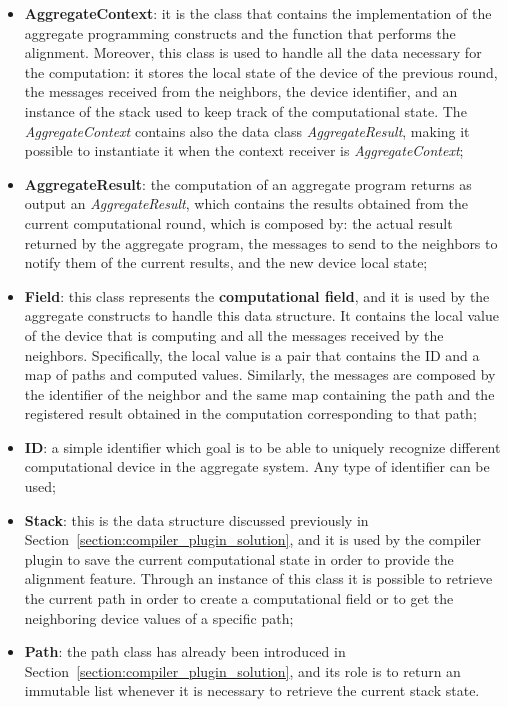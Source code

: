 \begin{itemize}
    \item \textbf{AggregateContext}: it is the class that contains the implementation of the aggregate programming constructs and the function that performs the alignment. Moreover, this class is used to handle all the data necessary for the computation: it stores the local state of the device of the previous round, the messages received from the neighbors, the device identifier, and an instance of the stack used to keep track of the computational state. The \textit{AggregateContext} contains also the data class \textit{AggregateResult}, making it possible to instantiate it when the context receiver is \textit{AggregateContext};
    \item \textbf{AggregateResult}: the computation of an aggregate program returns as output an \textit{AggregateResult}, which contains the results obtained from the current computational round, which is composed by: the actual result returned by the aggregate program, the messages to send to the neighbors to notify them of the current results, and the new device local state;
    \item \textbf{Field}: this class represents the \textbf{computational field}, and it is used by the aggregate constructs to handle this data structure. It contains the local value of the device that is computing and all the messages received by the neighbors. Specifically, the local value is a pair that contains the ID and a map of paths and computed values. Similarly, the messages are composed by the identifier of the neighbor and the same map containing the path and the registered result obtained in the computation corresponding to that path;
    \item \textbf{ID}: a simple identifier which goal is to be able to uniquely recognize different computational device in the aggregate system. Any type of identifier can be used;
    \item \textbf{Stack}: this is the data structure discussed previously in Section~\ref{section:compiler_plugin_solution}, and it is used by the compiler plugin to save the current computational state in order to provide the alignment feature. Through an instance of this class it is possible to retrieve the current path in order to create a computational field or to get the neighboring device values of a specific path;
    \item \textbf{Path}: the path class has already been introduced in Section~\ref{section:compiler_plugin_solution}, and its role is to return an immutable list whenever it is necessary to retrieve the current stack state.
\end{itemize}

